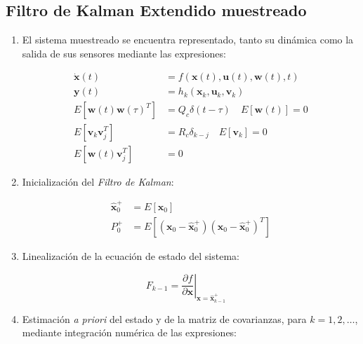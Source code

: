 \subsection{Filtro de Kalman Extendido muestreado}

\begin{enumerate}

\item El sistema muestreado se encuentra representado, tanto su dinámica como la salida de sus sensores mediante las expresiones:

\begin{equation}
\begin{split}
	\boldsymbol{\dot{x}}(t) &= f(\boldsymbol{x}(t),\boldsymbol{u}(t),\boldsymbol{w}(t),t) \\
	\boldsymbol{y}(t) &= h_k(\boldsymbol{x}_k,\boldsymbol{u}_k,\boldsymbol{v}_k) \\
	E[\boldsymbol{w}(t)\boldsymbol{w}(\tau)^T] &= Q_c \delta(t-\tau) \quad E[\boldsymbol{w}(t)] = 0 \\
	E[\boldsymbol{v}_k\boldsymbol{v}_j^T] &= R_c \delta_{k-j} \quad E[\boldsymbol{v}_k] = 0 \\
	E[\boldsymbol{w}(t)\boldsymbol{v}_j^T] &= 0
\end{split}
\end{equation}

\item Inicialización del \emph{Filtro de Kalman}:

\begin{equation}
\begin{split}
	\boldsymbol{\hat{x}}_0^{+} &= E[\boldsymbol{x}_0] \\
	P_0^{+}  &= E[(\boldsymbol{x}_0 - \boldsymbol{\hat{x}}_0^{+}) (\boldsymbol{x}_0 - \boldsymbol{\hat{x}}_0^{+})^T]
\end{split}
\end{equation}

\item Linealización de la ecuación de estado del sistema:

\begin{equation}
	F_{k-1} = \left.\frac{\partial f}{\partial\boldsymbol{x}} \right|_{\boldsymbol{x} = \boldsymbol{\hat{x}}_{k-1}^{+}} \quad 
\end{equation}

\item Estimación \emph{a priori} del estado y de la matriz de covarianzas, para $k = 1,2, \ldots$, mediante integración numérica de las expresiones: 


\end{enumerate}
